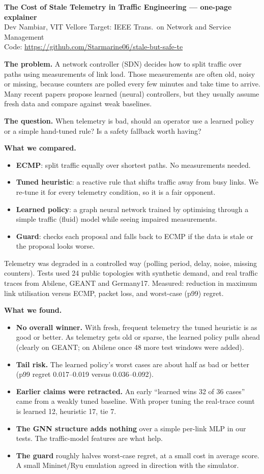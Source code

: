 \documentclass[10pt]{article}
\begin{document}
{\large\bfseries The Cost of Stale Telemetry in Traffic Engineering --- one-page explainer}\\
Dev Nambiar, VIT Vellore \quad Target: IEEE Trans.\ on Network and Service Management \\ Code: \url{https://github.com/Starmarine06/stale-but-safe-te}

\textbf{The problem.} A network controller (SDN) decides how to split traffic over paths using measurements of link load. Those measurements are often old, noisy or missing, because counters are polled every few minutes and take time to arrive. Many recent papers propose learned (neural) controllers, but they usually assume fresh data and compare against weak baselines.

\textbf{The question.} When telemetry is bad, should an operator use a learned policy or a simple hand-tuned rule? Is a safety fallback worth having?

\textbf{What we compared.}
\begin{itemize}
\item \textbf{ECMP}: split traffic equally over shortest paths. No measurements needed.
\item \textbf{Tuned heuristic}: a reactive rule that shifts traffic away from busy links. We re-tune it for every telemetry condition, so it is a fair opponent.
\item \textbf{Learned policy}: a graph neural network trained by optimising through a simple traffic (fluid) model while seeing impaired measurements.
\item \textbf{Guard}: checks each proposal and falls back to ECMP if the data is stale or the proposal looks worse.
\end{itemize}
Telemetry was degraded in a controlled way (polling period, delay, noise, missing counters). Tests used 24 public topologies with synthetic demand, and real traffic traces from Abilene, GEANT and Germany17. Measured: reduction in maximum link utilisation versus ECMP, packet loss, and worst-case (p99) regret.

\textbf{What we found.}
\begin{itemize}
\item \textbf{No overall winner.} With fresh, frequent telemetry the tuned heuristic is as good or better. As telemetry gets old or sparse, the learned policy pulls ahead (clearly on GEANT; on Abilene once 48 more test windows were added).
\item \textbf{Tail risk.} The learned policy's worst cases are about half as bad or better (p99 regret 0.017--0.019 versus 0.036--0.092).
\item \textbf{Earlier claims were retracted.} An early ``learned wins 32 of 36 cases'' came from a weakly tuned baseline. With proper tuning the real-trace count is learned 12, heuristic 17, tie 7.
\item \textbf{The GNN structure adds nothing} over a simple per-link MLP in our tests. The traffic-model features are what help.
\item \textbf{The guard} roughly halves worst-case regret, at a small cost in average score. A small Mininet/Ryu emulation agreed in direction with the simulator.
\end{itemize}
\end{document}
